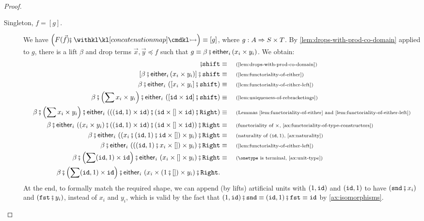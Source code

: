\begin{proof}
\begin{description}
\begin{description}
            \item[Singleton, $f = {[g]}$.] We have $\left(F(\vec f) \comp \concmap \right) \equiv [g]$, where $g : A \Rightarrow S \times T$. By \cref{lem:drops-with-prod-co-domain} applied to $g$, there is a lift $\beta$ and drop terms $\vec x, \vec y \preceq f$ such that $g \equiv \beta \comp \eithermany{i}{(x_i \times y_i)}$. We obtain:
            \begin{align*}
                [g] \comp \shiftterm \equalbecause{\cref{lem:drops-with-prod-co-domain}} \\ 
                [\beta \comp \eithermany{i}{(x_i \times y_i)}] \comp \shiftterm \equalbecause{\cref{lem:functoriality-of-either}} \\ 
                \beta \comp \eithermany{i}{\left([x_i \times y_i] \comp \shiftterm \right)} \equalbecause{\cref{lem:functoriality-of-either-left}} \\
                \beta \comp \left( \sum  x_i \times y_i \right) \comp \eithermany{i}{\left([\idterm \times \idterm] \comp \shiftterm \right)} \equalbecause{\cref{lem:uniqueness-of-rebracketings}} \\ 
                \beta \comp \left( \sum  x_i \times y_i \right) \comp \eithermany{i}{\left( (\unitrterm \times \idterm) \comp (\idterm \times [] \times \idterm) \comp \rightterm \right)} \equalbecause{Lemmas \ref{lem:functoriality-of-either} and \ref{lem:functoriality-of-either-left}} \\
                \beta \comp \eithermany{i}{\left( (x_i \times y_i) \comp (\unitrterm \times \idterm) \comp (\idterm \times [] \times \idterm) \right)} \comp \rightterm \equalbecause{functoriality of $\times$, \cref{ax:functoriality-of-type-constructors}} \\ 
                \beta \comp \eithermany{i}{\left( (x_i \comp \unitrterm \comp \idterm \times []) \times y_i \right)} \comp \rightterm \equalbecause{naturality of $\unitrterm$, \cref{ax:naturality}} \\ 
                \beta \comp \eithermany{i}{\left( (\unitrterm \comp x_i \times []) \times y_i \right)} \comp \rightterm \equalbecause{\cref{lem:functoriality-of-either-left}} \\
                \beta \comp \left( \sum \unitrterm \times \idterm \right) \comp \eithermany{i}{\left( x_i \times [] \times y_i \right)} \comp \rightterm \equalbecause{$\onetype$ is terminal, \cref{ax:unit-type}} \\ 
                \beta \comp \left( \sum \unitrterm \times \idterm \right) \comp \eithermany{i}{\left( x_i \times (1 \comp []) \times y_i \right)} \comp \rightterm.
            \end{align*}
            At the end, to formally match the required shape, we can append (by lifts) artificial units with $(1, \mathtt{id})$ and $(\mathtt{id}, 1)$ to have $(\sndterm \comp x_i)$ and $(\fstterm \comp y_i)$, instead of $x_i$ and $y_i$, which is valid by the fact that $\unitlterm \comp \sndterm \equiv \unitrterm \comp \fstterm \equiv \idterm$ by \cref{ax:isomorphisms}.


\end{description}
\end{description}
\end{proof}
